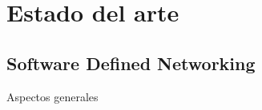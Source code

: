 \chapter{Estado del arte}

\graphicspath{{Chapter2/Figs/}}

\section{Software Defined Networking}
Aspectos generales




